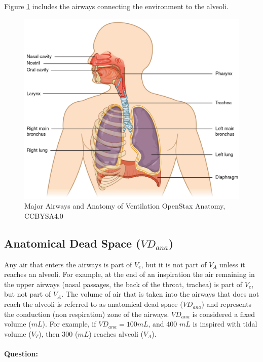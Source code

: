 Figure \ref{fig:airways} includes the airways connecting the environment to the alveoli.

\begin{figure}[!h]
    \centering
    \includegraphics[width=1.0 \linewidth]{./figure/ventilation/airways.jpg}
    \caption{Major Airways and Anatomy of Ventilation \footnotesize{OpenStax Anatomy, CCBYSA4.0}}
    \label{fig:airways}
\end{figure}

\subsection{Anatomical Dead Space ($VD_{ana}$)}

Any air that enters the airways is part of $V_e$, but it is not part of $V_A$ unless it reaches an alveoli. For example, at the end of an inspiration the air remaining in the upper airways (nasal passages, the back of the throat, trachea) is part of $V_e$, but not part of $V_A$. The volume of air that is taken into the airways that does not reach the alveoli is referred to as anatomical dead space ($VD_{ana}$) and represents the conduction (non respiration) zone of the airways. $VD_{ana}$ is considered a fixed volume ($mL$). For example, if $VD_{ana} = 100 mL$, and 400 $mL$ is inspired with tidal volume ($V_T$), then 300 ($mL$) reaches alveoli ($V_A$). 

\paragraph{Question:}


